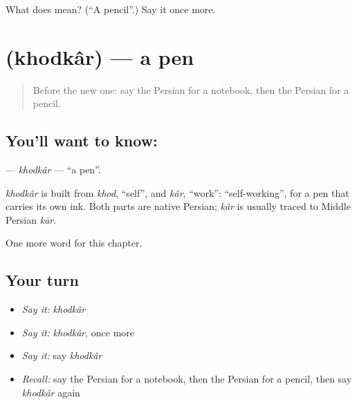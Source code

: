 \begin{tcolorbox}[breakable,colback=teal!4,colframe=teal!35!black,title={Before you move on}]
What does  mean? (\textquotedblleft{}A pencil\textquotedblright{}.) Say it once more.
\end{tcolorbox}
\section[\texorpdfstring{\fa{خودکار} (khodkâr)}{خودکار (khodkâr)}]{ (khodkâr) — a pen}

\label{lesson:FA-C49-khodkar}



\begin{quote}
Before the new one: say the Persian for a notebook, then the Persian for a pencil.
\end{quote}

\subsection*{You'll want to know: }
\textbf{} — \emph{khodkâr} — \textquotedblleft{}a pen\textquotedblright{}.

\begin{cousinweb}
\emph{khodkâr} is built from \emph{khod}, \textquotedblleft{}self\textquotedblright{}, and \emph{kâr}, \textquotedblleft{}work\textquotedblright{}: \textquotedblleft{}self-working\textquotedblright{}, for a pen that carries its own ink. Both parts are native Persian; \emph{kâr} is usually traced to Middle Persian \emph{kār}.
\end{cousinweb}

\begin{grammarlens}[title={What you've built}]
One more word for this chapter.
\end{grammarlens}

\subsection*{Your turn}
\begin{itemize}
\raggedright
  \item \emph{Say it:} \emph{khodkâr}
  \item \emph{Say it:} \emph{khodkâr}, once more
  \item \emph{Say it:} say \emph{khodkâr}
  \item \emph{Recall:} say the Persian for a notebook, then the Persian for a pencil, then say \emph{khodkâr} again
\end{itemize}

